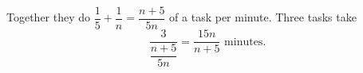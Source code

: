 Together they do $\dfrac15+\dfrac1n=\dfrac{n+5}{5n}$ of a task per minute. Three tasks take
\[\dfrac{3}{\dfrac{n+5}{5n}}=\boxed{\dfrac{15n}{n+5}\text{ minutes}}.\]
